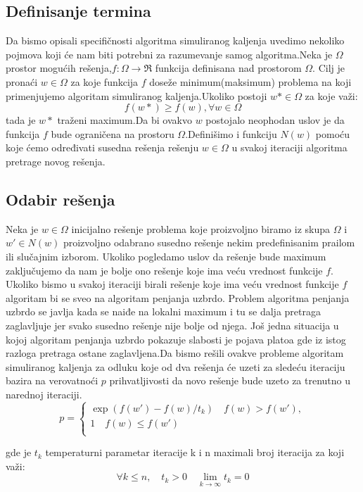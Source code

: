 \documentclass[a4paper]{article}
\begin{document}
\subsection{Definisanje termina}
Da bismo opisali specifičnosti algoritma simuliranog kaljenja uvedimo nekoliko pojmova koji će nam biti potrebni za razumevanje samog algoritma.Neka je $\Omega$ prostor mogućih rešenja,$f:\Omega \rightarrow \Re$ funkcija definisana nad prostorom $\Omega$. Cilj je pronaći  $w\in\Omega$ za koje funkcija $f$ doseže minimum(maksimum) problema na koji primenjujemo algoritam simuliranog kaljenja.Ukoliko postoji $w*\in\Omega$ za koje  važi:$$f(w*)\geq f(w) , \forall w \in \Omega$$ tada je $w*$ traženi maximum.Da bi ovakvo $w$ postojalo neophodan uslov je da funkcija $f$ bude ograničena na prostoru $\Omega$.Definišimo i funkciju $N(w)$ pomoću koje ćemo određivati susedna rešenja rešenju  $w\in\Omega$ u svakoj iteraciji algoritma pretrage novog rešenja. \par

\subsection{Odabir rešenja}
Neka je $w\in\Omega$ inicijalno rešenje problema koje proizvoljno biramo iz skupa $\Omega$ i $w'\in N(w)$ proizvoljno odabrano susedno rešenje nekim predefinisanim prailom ili slučajnim izborom. Ukoliko pogledamo uslov da rešenje bude maximum zaključujemo da nam je bolje ono rešenje koje ima veću vrednost funkcije $f$. Ukoliko bismo u svakoj iteraciji birali rešenje koje ima veću vrednost funkcije $f$ algoritam bi se sveo na algoritam penjanja uzbrdo. Problem algoritma penjanja uzbrdo se javlja kada se naiđe na lokalni maximum i tu se dalja pretraga zaglavljuje jer svako susedno rešenje nije bolje od njega. Još jedna situacija u kojoj algoritam penjanja uzbrdo pokazuje slabosti je pojava platoa gde iz istog razloga pretraga ostane zaglavljena.Da bismo rešili ovakve probleme algoritam simuliranog kaljenja za odluku koje od dva rešenja će uzeti za sledeću iteraciju bazira na verovatnoći $p$ prihvatljivosti da novo rešenje bude uzeto za trenutno u narednoj iteraciji.
\[ p =
  \begin{cases}
    \exp(f(w')-f(w)/t_k)  \quad f(w) > f(w'),\\
    1  \quad f(w) \leq f(w')\\
  \end{cases}
\]


gde je $t_k$ temperaturni parametar iteracije k i n maximali broj iteracija za koji važi:
$$\forall k\leq n, \quad t_k > 0 \quad \lim_{k \to \infty}t_k=0 $$
\end{document}
